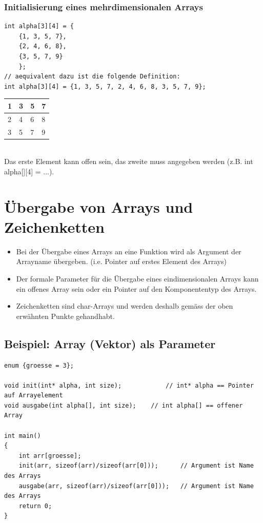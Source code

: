 \subsubsection{Initialisierung eines mehrdimensionalen Arrays}
\noindent
\begin{minipage}{0.68\linewidth}
\begin{lstlisting}
int alpha[3][4] = {
	{1, 3, 5, 7},
	{2, 4, 6, 8},
	{3, 5, 7, 9}
	};
// aequivalent dazu ist die folgende Definition:
int alpha[3][4] = {1, 3, 5, 7, 2, 4, 6, 8, 3, 5, 7, 9};
\end{lstlisting}
\end{minipage}
\hfill
\begin{minipage}{0.25\linewidth}
\begin{tabularx}{\textwidth}{|X|X|X|X|}
	\hline
	1 & 3 & 5 & 7\\
	\hline
	2 & 4 & 6 & 8\\
	\hline
	3 & 5 & 7 & 9\\
	\hline
\end{tabularx}
\end{minipage}\\
Das erste Element kann offen sein, das zweite muss angegeben werden (z.B. int alpha[][4] = ...).

\section{Übergabe von Arrays und Zeichenketten}
\begin{itemize}
	\item Bei der Übergabe eines Arrays an eine Funktion wird als Argument der Arrayname übergeben. (i.e. Pointer auf erstes Element des Arrays)
	\item Der formale Parameter für die Übergabe eines eindimensionalen Arrays kann ein offenes Array sein oder ein Pointer auf den Komponententyp des Arrays.
	\item Zeichenketten sind char-Arrays und werden deshalb gemäss der oben erwähnten Punkte gehandhabt.
\end{itemize}

\subsection{Beispiel: Array (Vektor) als Parameter}
\noindent
\begin{minipage}{\linewidth}
\begin{lstlisting}
enum {groesse = 3};

void init(int* alpha, int size);			// int* alpha == Pointer auf Arrayelement
void ausgabe(int alpha[], int size);	// int alpha[] == offener Array

int main()
{
	int arr[groesse];
	init(arr, sizeof(arr)/sizeof(arr[0]));		// Argument ist Name des Arrays
	ausgabe(arr, sizeof(arr)/sizeof(arr[0]));	// Argument ist Name des Arrays
	return 0;
}
\end{lstlisting}
\end{minipage}

